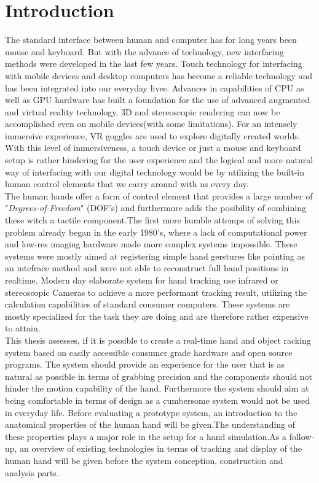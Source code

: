 \chapter{Introduction}
The standard interface between human and computer has for long years been mouse and keyboard. But with the advance of technology, new interfacing methods were developed in the last few years.
Touch technology for interfacing with mobile devices and desktop computers has become a reliable technology and has been integrated into our everyday lives.
Advances in capabilities of CPU as well as GPU hardware has built a foundation for the use of advanced augmented and virtual reality technology. 3D and stereoscopic rendering can now be accomplished even on mobile devices(with some limitations). For an intensely immersive experience, VR goggles are used to explore digitally created worlds.\\
With this level of immersiveness, a touch device or just a mouse and keyboard setup is rather hindering for the user experience and the logical and more natural way of interfacing with our digital technology would be by utilizing the built-in human control elements that we carry around with us every day.\\ The human hands offer a form of control element that provides a large number of "\textit{Degrees-of-Freedom}" (DOF's) and furthermore adds the posibility of combining these witch a tactile component.The first more humble attemps of solving this problem already began in the early 1980's, where a lack of computational power and low-res imaging hardware made more complex systems impossible. These systems were mostly aimed at registering simple hand gerstures like pointing as an intefrace method and were not able to reconstruct full hand positions in realtime\cite{Bolt.1980}. Modern day elaborate system for hand tracking use infrared or stereoscopic Cameras to achieve a  more performant tracking result, utilizing the calculation capabilities of standard consumer computers. These systems are mostly specialized for the task they are doing and are therefore rather expensive to attain. \\
This thesis assesses, if it is possible to create a real-time hand and object racking system based on easily accessible consumer grade hardware and open source programs. The system should provide an experience for the user that is as natural as possible in terms of grabbing precision and the components should not hinder the motion capability of the hand. Furthermore the system should aim at being comfortable in terms of design as a cumbersome system would not be used  in everyday life.
Before evaluating a prototype system, an introduction to the anatomical properties of the human hand will be given.The understanding of these properties plays a major role in the setup for a hand simulation.As a follow-up, an overview of existing technologies in terms of tracking and display of the human hand will be given before the system conception, construction and analysis parts.

